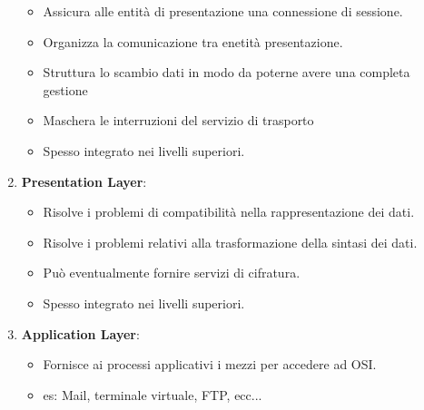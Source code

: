 \documentclass[12pt]{article}
\begin{document}
\begin{enumerate}
\begin{itemize}
      \item Assicura alle entità di presentazione una connessione di sessione.
      \item Organizza la comunicazione tra enetità presentazione.
      \item Struttura lo scambio dati in modo da poterne avere una completa gestione
      \item Maschera le interruzioni del servizio di trasporto
      \item Spesso integrato nei livelli superiori.
    \end{itemize}
  \item \textbf{Presentation Layer}:
    \begin{itemize}
      \item Risolve i problemi di compatibilità nella rappresentazione dei dati.
      \item Risolve i problemi relativi alla trasformazione della sintasi dei dati.
      \item Può eventualmente fornire servizi di cifratura.
      \item Spesso integrato nei livelli superiori.
    \end{itemize}
    \item \textbf{Application Layer}:
      \begin{itemize}
        \item Fornisce ai processi applicativi i mezzi per accedere ad OSI.
        \item es: Mail, terminale virtuale, FTP, ecc...
      \end{itemize}
\end{enumerate} %



\end{document}
